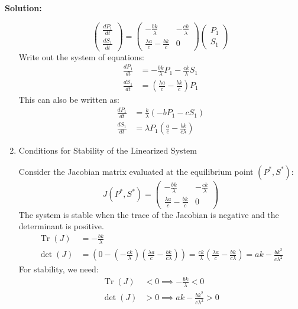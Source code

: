\documentclass[12pt]{article}
\DeclareMathOperator{\Tr}{Tr}
\newenvironment{solution}{
    \textbf{Solution:}
    
}{
    
    \vspace{2em}
}
\begin{document}
\begin{solution}
\begin{enumerate}
\[            \begin{pmatrix}
                \frac{dP_1}{dt} \\
                \frac{dS_1}{dt}
            \end{pmatrix}
            =
            \begin{pmatrix}
                -\frac{bk}{\lambda} & -\frac{ck}{\lambda} \\
                \frac{\lambda a}{c} - \frac{bk}{c} & 0
            \end{pmatrix}
            \begin{pmatrix}
                P_1 \\
                S_1
            \end{pmatrix}
        \]
        Write out the system of equations:
        \[
            \begin{aligned}
                \frac{dP_1}{dt} &= -\frac{bk}{\lambda} P_1 - \frac{ck}{\lambda} S_1 \\
                \frac{dS_1}{dt} &= \left( \frac{\lambda a}{c} - \frac{bk}{c} \right) P_1
            \end{aligned}
        \]
        This can also be written as:
        \[
            \begin{aligned}
                \frac{dP_1}{dt} &= \frac{k}{\lambda} (-bP_1 - cS_1)\\
                \frac{dS_1}{dt} &= \lambda P_1 \left(\frac{a}{c} - \frac{bk}{c\lambda}\right)
            \end{aligned}
        \]
        \item Conditions for Stability of the Linearized System
        
        Consider the Jacobian matrix evaluated at the equilibrium point \( \left( P^*, S^* \right) \):
        \[
            J(P^*, S^*) = \begin{pmatrix}
                -\frac{bk}{\lambda} & -\frac{ck}{\lambda} \\
                \frac{\lambda a}{c} - \frac{bk}{c} & 0
            \end{pmatrix}
        \]
        The system is stable when the trace of the Jacobian is negative and the determinant is positive.
        \[
            \begin{aligned}
                \Tr(J) &= -\frac{bk}{\lambda} \\
                \det(J) &= \left(0 - \left(-\frac{ck}{\lambda}\right)\left(\frac{\lambda a}{c} - \frac{bk}{c\lambda}\right)\right) = \frac{ck}{\lambda}\left(\frac{\lambda a}{c} - \frac{bk}{c\lambda}\right) = ak - \frac{bk^2}{c\lambda^2}
            \end{aligned}
        \]
        For stability, we need:
        \[
            \begin{aligned}
                \Tr(J) &< 0 \implies -\frac{bk}{\lambda} < 0\\
                \det(J) &> 0 \implies ak - \frac{bk^2}{c\lambda^2} > 0
            \end{aligned}
        \]


\end{enumerate}
\end{solution}
\end{document}
